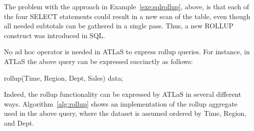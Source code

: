 {The problem with the approach in Example~\ref{exe:sqlrollup}, above, is
that each of the four {\cw SELECT} statements could result in a new scan
of the table, even though all needed subtotals can be gathered in a
single pass. Thus, a new {\cw ROLLUP} construct was introduced in SQL.

No ad hoc operator is needed in ATLaS to express rollup queries.
For instance, in ATLaS the above query can be expressed succinctly as
follows:
{
\begin{codedisplay}
\> \>  rollup(Time, Region, Dept, Sales)  data;\\
\end{codedisplay}
}
Indeed, the rollup functionality can be expressed by ATLaS in several
different ways. Algorithm~\ref{alg:rollup} shows an implementation of
the {\bw rollup} aggregate used in the above query, where the dataset
is assumed ordered by Time, Region, and Dept.
{
  \renewcommand{\baselinestretch}{1}
  \normalsize

}}
